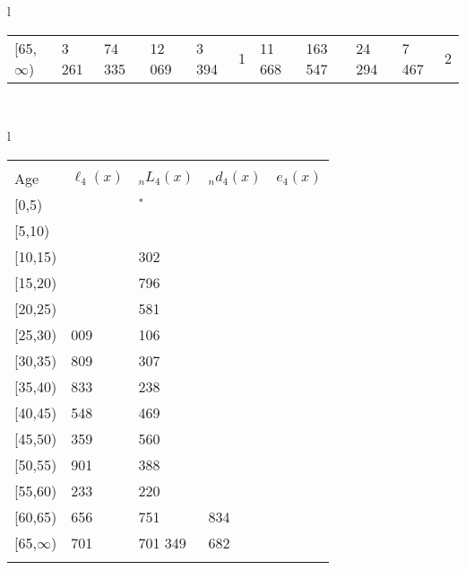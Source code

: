 \documentclass[
]{article}
\begin{document}
\begin{table}
\begin{tabular}[t]{l}
\begin{tabular}
{}[65,$\infty$) & 3 261 & 74 335 & 12 069 & 3 394 & 1 & 11 668 & 163 547 & 24 294 & 7 467 & 2\\
\end{tabular}\\
\end{tabular}
\centering
\begin{tabular}[t]{l}
\hline
\begin{tabular}{>{\raggedright\arraybackslash}p{.43in}>{\raggedleft\arraybackslash}p{1.3in}>{\raggedleft\arraybackslash}p{1.3in}>{\raggedleft\arraybackslash}p{1.3in}>{\raggedleft\arraybackslash}p{1.3in}}
\toprule
\multicolumn{1}{c}{ } & \multicolumn{4}{c}{(4) Lost both} \\
\cmidrule(l{3pt}r{3pt}){2-5}
Age & $\ell_{4}(x)$ & ${}_nL_{4}(x)$ & ${}_nd_{4}(x)$ & $e_{4}(x)$\\
\midrule
{}[0,5) & 0 & 158$^{*}$ & 0 & 25\\
{}[5,10) & 126 & 819 & 0 & 26\\
{}[10,15) & 173 & 1 302 & 0 & 26\\
{}[15,20) & 282 & 1 796 & 1 & 26\\
{}[20,25) & 490 & 3 581 & 2 & 26\\
\addlinespace
{}[25,30) & 1 009 & 8 106 & 4 & 26\\
{}[30,35) & 1 809 & 14 307 & 8 & 26\\
{}[35,40) & 2 833 & 24 238 & 17 & 26\\
{}[40,45) & 5 548 & 49 469 & 49 & 25\\
{}[45,50) & 11 359 & 86 560 & 137 & 25\\
\addlinespace
{}[50,55) & 16 901 & 140 388 & 357 & 24\\
{}[55,60) & 28 233 & 209 220 & 790 & 23\\
{}[60,65) & 40 656 & 304 751 & 1 834 & 21\\
{}[65,$\infty$) & 52 701 & 1 701 349 & 77 682 & 19\\
\bottomrule
\multicolumn{5}{l}{\rule{0pt}{1em}\textsuperscript{*} Based on an estimated from SIPP with less than 10 respondents in the numerator.}\\
\end{tabular}\\
\end{tabular}
\end{table}
\end{document}
